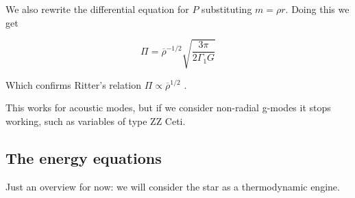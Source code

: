 \documentclass[main.tex]{subfiles}
\begin{document}
We also rewrite the differential equation for \(P\) substituting \(m=\rho r\). Doing this we get

\begin{equation}
  \Pi = \overline{\rho}^{-1/2} \sqrt{\frac{3 \pi}{2 \Gamma_1 G}}
\end{equation}

Which confirms Ritter's relation \(\Pi \propto \overline{\rho}^{1/2} \) .

This works for acoustic modes, but if we consider non-radial g-modes it stops working, such as variables of type ZZ Ceti.

\subsection{The energy equations}

Just an overview for now: we will consider the star as a thermodynamic engine.
\end{document}
